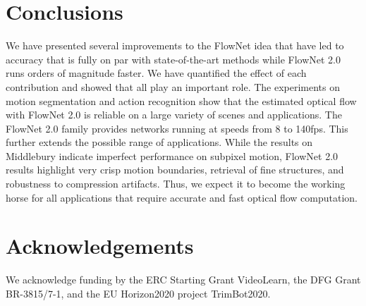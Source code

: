 \documentclass[10pt,twocolumn,letterpaper]{article}%
\begin{document}
\section{Conclusions} 
\label{sec:conclusion}

We have presented several improvements to the FlowNet idea that have led to accuracy that is fully on par with state-of-the-art methods while FlowNet 2.0 runs orders of magnitude faster. We have quantified the effect of each contribution and showed that all play an important role. The experiments on motion segmentation and action recognition show that the estimated optical flow with FlowNet 2.0 is reliable on a large variety of scenes and applications. The FlowNet 2.0 family provides networks running at speeds from 8 to 140fps. This further extends the possible range of applications. While the results on Middlebury indicate imperfect performance on subpixel motion, FlowNet 2.0 results highlight very crisp motion boundaries, retrieval of fine structures, and robustness to compression artifacts. Thus, we expect it to become the working horse for all applications that require accurate and fast optical flow computation. 


\section*{Acknowledgements} 

We acknowledge funding by the ERC Starting Grant VideoLearn, the DFG Grant BR-3815/7-1, and the EU Horizon2020 project TrimBot2020. 
\end{document}
